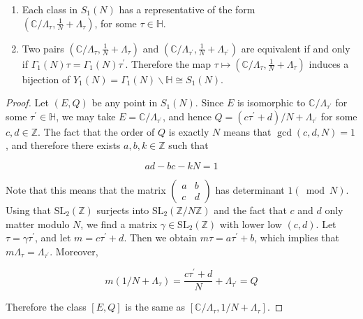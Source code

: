 \begin{proposition}
    \begin{enumerate}
  \item Each class in $S_{1}(N)$ has a representative of the form\\ $\left(\mathbb{C} / \Lambda_{\tau}, \frac{1}{N}+\Lambda_{\tau}\right)$, for some $\tau \in \mathbb{H}$.

  \item Two pairs $\left(\mathbb{C} / \Lambda_{\tau}, \frac{1}{N}+\Lambda_{\tau}\right)$ and $\left(\mathbb{C} / \Lambda_{\tau^{\prime}}, \frac{1}{N}+\Lambda_{\tau^{\prime}}\right)$ are equivalent if and only if $\Gamma_{1}(N) \tau=\Gamma_{1}(N) \tau^{\prime}$. Therefore the map $\tau \mapsto\left(\mathbb{C} / \Lambda_{\tau}, \frac{1}{N}+\Lambda_{\tau}\right)$ induces a bijection of $Y_{1}(N)=\Gamma_{1}(N) \backslash \mathbb{H} \cong S_{1}(N)$.

\end{enumerate}

\begin{proof}
    Let $(E, Q)$ be any point in $S_{1}(N)$. Since $E$ is isomorphic to $\mathbb{C} / \Lambda_{\tau^{\prime}}$ for some $\tau^{\prime} \in \mathbb{H}$, we may take $E=\mathbb{C} / \Lambda_{\tau^{\prime}}$, and hence $Q=\left(c \tau^{\prime}+d\right) / N+\Lambda_{\tau^{\prime}}$ for some $c, d \in \mathbb{Z}$. The fact that the order of $Q$ is exactly $N$ means that $\operatorname{gcd}(c, d, N)=1$, and therefore there exists $a, b, k \in \mathbb{Z}$ such that

$$
a d-b c-k N=1
$$

Note that this means that the matrix $\left(\begin{array}{ll}a & b \\ c & d\end{array}\right)$ has determinant $1(\bmod N)$. Using that $\mathrm{SL}_{2}(\mathbb{Z})$ surjects into $\mathrm{SL}_{2}(\mathbb{Z} / N \mathbb{Z})$ and the fact that $c$ and $d$ only matter modulo $N$, we find a matrix $\gamma \in \mathrm{SL}_{2}(\mathbb{Z})$ with lower low $(c, d)$. Let $\tau=\gamma \tau^{\prime}$, and let $m=c \tau^{\prime}+d$. Then we obtain $m \tau=a \tau^{\prime}+b$, which implies that $m \Lambda_{\tau}=\Lambda_{\tau^{\prime}}$. Moreover,

$$
m\left(1 / N+\Lambda_{\tau}\right)=\frac{c \tau^{\prime}+d}{N}+\Lambda_{\tau^{\prime}}=Q
$$

Therefore the class $[E, Q]$ is the same as $\left[\mathbb{C} / \Lambda_{\tau}, 1 / N+\Lambda_{\tau}\right]$.


\end{proof}
\end{proposition}
